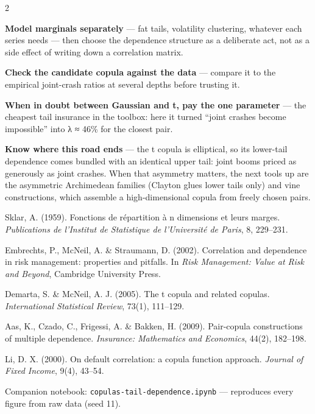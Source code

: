 \documentclass{pyportfolios-note}
\begin{document}
\begin{multicols}{2}
\begin{notebullets}
\item \textbf{Model marginals separately} — fat tails, volatility clustering,
      whatever each series needs — then choose the dependence structure as a
      deliberate act, not as a side effect of writing down a correlation matrix.
\item \textbf{Check the candidate copula against the data} — compare it to the
      empirical joint-crash ratios at several depths before trusting it.
\item \textbf{When in doubt between Gaussian and t, pay the one parameter} — the
      cheapest tail insurance in the toolbox: here it turned ``joint crashes
      become impossible'' into λ ≈ 46\% for the closest pair.
\item \textbf{Know where this road ends} — the t copula is elliptical, so its
      lower-tail dependence comes bundled with an identical upper tail: joint
      booms priced as generously as joint crashes. When that asymmetry matters,
      the next tools up are the asymmetric Archimedean families (Clayton glues
      lower tails only) and vine constructions, which assemble a
      high-dimensional copula from freely chosen pairs.
\end{notebullets}
\end{multicols}


\noteneedroom{200bp}
\begin{notereferences}
\item Sklar, A. (1959). Fonctions de répartition à n dimensions et leurs marges.
      \textit{Publications de l'Institut de Statistique de l'Université de
      Paris}, 8, 229–231.
\item Embrechts, P., McNeil, A. \& Straumann, D. (2002). Correlation and
      dependence in risk management: properties and pitfalls. In \textit{Risk
      Management: Value at Risk and Beyond}, Cambridge University Press.
\item Demarta, S. \& McNeil, A. J. (2005). The t copula and related copulas.
      \textit{International Statistical Review}, 73(1), 111–129.
\item Aas, K., Czado, C., Frigessi, A. \& Bakken, H. (2009). Pair-copula
      constructions of multiple dependence. \textit{Insurance: Mathematics and
      Economics}, 44(2), 182–198.
\item Li, D. X. (2000). On default correlation: a copula function approach.
      \textit{Journal of Fixed Income}, 9(4), 43–54.
\item Companion notebook: \texttt{copulas-tail-dependence.ipynb} — reproduces
      every figure from raw data (seed 11).
\end{notereferences}
\end{document}
